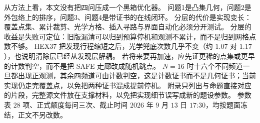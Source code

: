从方法上看，本文没有把四问压成一个黑箱优化器。
问题1是凸集几何，问题2是外包络上的排序，问题3、问题4是带证书的在线闭环。
分层的代价是实现变长：覆盖点集、累计裁剪、光学方格、插入寻路与界面自动化必须分开测试。
分层的收益是失败可定位：旧版漏清可以归到预算停机和观测不累计，而不是归到网格点数不够。
HEX37 把发现行程缩短之后，光学兜底次数几乎不变（约 $1.07$ 对 $1.17$），也说明清除层已经从发现层解耦。
若将来要再加速，应先证更稀的点集或更早的计数判空，而不是把 SAFE 走廊改成随机跳点。
$N=16$ 时十六个不同频道一旦都出现正观测，其余四频道可由计数判空，这是计数证书而不是几何证书；当前实现仍走完覆盖点，以免把两种证书混成提前停机。
附录只列出与命题直接对应的片段，完整源文件放在支撑材料，以免把实现细节误写成新的题设参数。
参数表 $28$ 项、正式额度每问三次、截止时间 $2026$ 年 $9$ 月 $13$ 日 $17$:$30$，均按题面冻结，正文不另改数。
